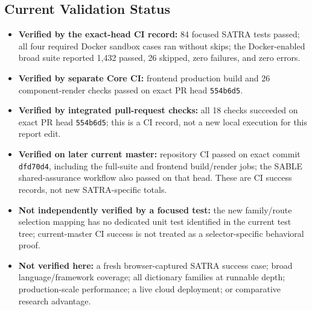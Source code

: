 \subsection{Current Validation Status}
\begin{itemize}
    \item \textbf{Verified by the exact-head CI record:} 84 focused SATRA tests passed; all four required Docker sandbox cases ran without skips; the Docker-enabled broad suite reported 1,432 passed, 26 skipped, zero failures, and zero errors.
    \item \textbf{Verified by separate Core CI:} frontend production build and 26 component-render checks passed on exact PR head \texttt{554b6d5}.
    \item \textbf{Verified by integrated pull-request checks:} all 18 checks succeeded on exact PR head \texttt{554b6d5}; this is a CI record, not a new local execution for this report edit.
    \item \textbf{Verified on later current master:} repository CI passed on exact commit \texttt{dfd70d4}, including the full-suite and frontend build/render jobs; the SABLE shared-assurance workflow also passed on that head. These are CI success records, not new SATRA-specific totals.
    \item \textbf{Not independently verified by a focused test:} the new family/route selection mapping has no dedicated unit test identified in the current test tree; current-master CI success is not treated as a selector-specific behavioral proof.
    \item \textbf{Not verified here:} a fresh browser-captured SATRA success case; broad language/framework coverage; all dictionary families at runnable depth; production-scale performance; a live cloud deployment; or comparative research advantage.
\end{itemize}
